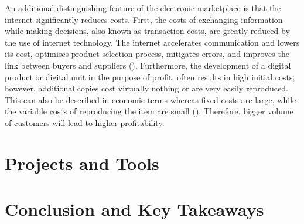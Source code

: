 \documentclass[12pt,a4paper]{article}
\begin{document}
An additional distinguishing feature of the electronic marketplace is that the internet significantly reduces costs. First, the costs of exchanging information while making decisions, also known as transaction costs, are greatly reduced by the use of internet technology. The internet accelerates communication and lowers its cost, optimises product selection process, mitigates errors, and improves the link between buyers and suppliers (\cite{bunduchiBusinessRelationshipsInternetbased2005}). Furthermore, the development of a digital product or digital unit in the purpose of profit, often results in high initial costs, however, additional copies cost virtually nothing or are very easily reproduced. This can also be described in economic terms whereas fixed costs are large, while the variable costs of reproducing the item are small (\cite{shapiroInformationRulesStrategic1998a}). Therefore, bigger volume of customers will lead to higher profitability.



\section{Projects and Tools}
\label{project_tools}


\newpage

\section{Conclusion and Key Takeaways}
\label{conclusion}


\newpage

 
\pagebreak


\nocite{mccarthyAmericansTrustTech}
\printbibliography



\end{document}
